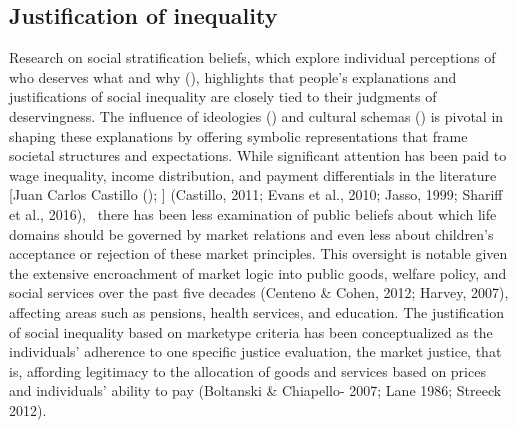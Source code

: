 \documentclass[
  letterpaper,
  DIV=11,
  numbers=noendperiod]{scrartcl}
\begin{document}
\subsection{Justification of
inequality}\label{justification-of-inequality}

Research on social stratification beliefs, which explore individual
perceptions of who deserves what and why
(),
highlights that people's explanations and justifications of social
inequality are closely tied to their judgments of deservingness. The
influence of ideologies () and cultural schemas
() is
pivotal in shaping these explanations by offering symbolic
representations that frame societal structures and expectations. While
significant attention has been paid to wage inequality, income
distribution, and payment differentials in the literature {[}Juan Carlos
Castillo (); {]} (Castillo,
2011; Evans et al., 2010; Jasso, 1999; Shariff et al., 2016),~ there has
been less examination of public beliefs about which life domains should
be governed by market relations and even less about children's
acceptance or rejection of these market principles. This oversight is
notable given the extensive encroachment of market logic into public
goods, welfare policy, and social services over the past five decades
(Centeno \& Cohen, 2012; Harvey, 2007), affecting areas such as
pensions, health services, and education. The justification of social
inequality based on marketype criteria has been conceptualized as the
individuals' adherence to one specific justice evaluation, the market
justice, that is, affording legitimacy to the allocation of goods and
services based on prices and individuals' ability to pay (Boltanski \&
Chiapello- 2007; Lane 1986; Streeck 2012).
\end{document}
